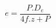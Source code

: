 \documentclass[12pt]{article}
\begin{document}
\begin{displaymath}
e = \frac {P . D_e} {4f . z + P}
\end{displaymath}
\end{document}
